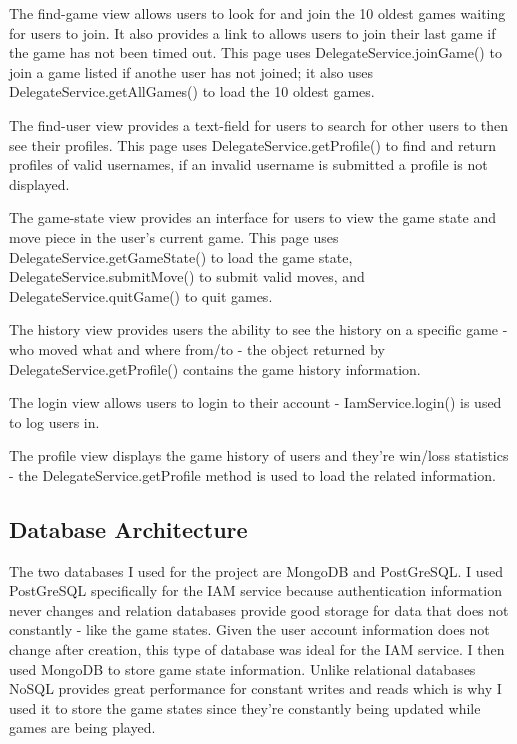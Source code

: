 \documentclass[12pt]{article}
\begin{document}
The find-game view allows users to look for and join the 10 oldest games waiting for users to join. It also provides a link to 
allows users to join their last game if the game has not been timed out. This page uses DelegateService.joinGame() to join a game listed if 
anothe user has not joined; it also uses DelegateService.getAllGames() to load the 10 oldest games.

The find-user view provides a text-field for users to search for other users to then see their profiles. This page uses DelegateService.getProfile() 
to find and return profiles of valid usernames, if an invalid username is submitted a profile is not displayed.

The game-state view provides an interface for users to view the game state and move piece in the user's current game. This page 
uses DelegateService.getGameState() to load the game state, DelegateService.submitMove() to submit valid moves, and DelegateService.quitGame() 
to quit games.

The history view provides users the ability to see the history on a specific game - who moved what and where from/to - 
the object returned by DelegateService.getProfile() contains the game history information.

The login view allows users to login to their account - IamService.login() is used to log users in.

The profile view displays the game history of users and they're win/loss statistics - the DelegateService.getProfile method 
is used to load the related information.

\subsection{Database Architecture}
The two databases I used for the project are MongoDB and PostGreSQL. I used PostGreSQL specifically for the IAM service 
because authentication information never changes and relation databases provide good storage for data that does not constantly 
- like the game states. Given the user account information does not change after creation, this type of database was ideal for 
the IAM service. I then used MongoDB to store game state information. Unlike relational databases NoSQL provides great 
performance for constant writes and reads which is why I used it to store the game states since they're constantly being updated 
while games are being played.
\end{document}
